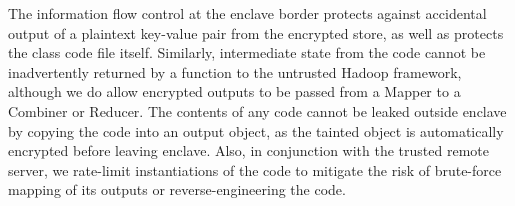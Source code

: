 The information flow control at the enclave border protects against
accidental output of a plaintext key-value pair from the encrypted store,
as well as protects the class code file itself.
Similarly, intermediate state from the code cannot be inadvertently returned by a function to the untrusted Hadoop framework,
although we do allow encrypted outputs to be passed from a Mapper to a Combiner or Reducer.
The contents of any code cannot be leaked outside enclave by copying the code into an output object, as the tainted object is automatically encrypted before leaving enclave. %
Also, in conjunction with the trusted remote server, we rate-limit instantiations of the code to mitigate the risk of
brute-force mapping of its outputs or reverse-engineering the code.

\begin{comment}

\paragraph{Secure Data Manager Web-app.}
\sysname{} can also secure {\em Java Network Launch Protocol} (JNLP) applets and web-start apps, effectively 
extending trust from a remote trusted server to a client enclave using any web-app 
plugged into a supported browser. This allows the developers to offload some of the 
computation on secret data to the client machine from the trusted server.

For instance, in a large medical hospital with a centralized repository of patient data,
the doctors may want to access any patient data from any terminal using a web browser.
A web developer can design an applet such as Secure Data 
Manager(SDM)~\cite{sdm-applet} to store the secret patient data on a client machine, 
and display this information securely using Intel Protected Audio and Video Path 
(PAVP) technology~\cite{intel-pavp}.
However, to protect the sensitive patient information from untrusted system stack, the 
developer can use \sysname{} to isolate the classes that represent the secure data 
in an enclave. The developer just has to identify such classes representing the secret 
data and display methods, and the \sysname{} seamlessly creates enclave for 
managing secret data.
The trusted data manager class authenticates the doctor and loads the provisioned data 
from the remote trusted server. The Intel PAVP enabled displays can then take the input from the display methods of the trusted data manager class.


\end{comment}

